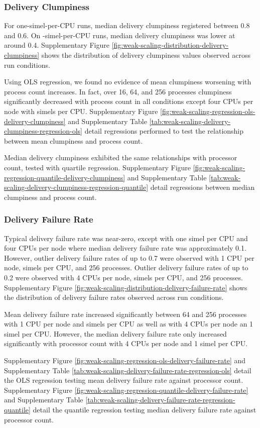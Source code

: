 \subsubsection{Delivery Clumpiness}

For one-simel-per-CPU runs, median delivery clumpiness registered between 0.8 and 0.6.
On -simel-per-CPU runs, median delivery clumpiness was lower at around 0.4.
Supplementary Figure \ref{fig:weak-scaling-distribution-delivery-clumpiness}
shows the distribution of delivery clumpiness values observed across run conditions.

Using OLS regression, we found no evidence of mean clumpiness worsening with process count increases.
In fact, over 16, 64, and 256 processes clumpiness significantly decreased with process count in all conditions except four CPUs per node with  simels per CPU.
Supplementary Figure \ref{fig:weak-scaling-regression-ols-delivery-clumpiness} and Supplementary Table \ref{tab:weak-scaling-delivery-clumpiness-regression-ols} detail regressions performed to test the relationship between mean clumpiness and process count.

Median delivery clumpiness exhibited the same relationships with processor count, tested with quartile regression.
Supplementary Figure \ref{fig:weak-scaling-regression-quantile-delivery-clumpiness} and Supplementary Table \ref{tab:weak-scaling-delivery-clumpiness-regression-quantile} detail regressions between median clumpiness and process count.

\subsubsection{Delivery Failure Rate}

Typical delivery failure rate was near-zero, except with one simel per CPU and four CPUs per node where median delivery failure rate was approximately 0.1.
However, outlier delivery failure rates of up to 0.7 were observed with 1 CPU per node,  simels per CPU, and 256 processes.
Outlier delivery failure rates of up to 0.2 were observed with 4 CPUs per node,  simels per CPU, and 256 processes.
Supplementary Figure \ref{fig:weak-scaling-distribution-delivery-failure-rate} shows the distribution of delivery failure rates observed across run conditions.

Mean delivery failure rate increased significantly between 64 and 256 processes with 1 CPU per node and  simels per CPU as well as with 4 CPUs per node an 1 simel per CPU.
However, the median delivery failure rate only increased significantly with processor count with 4 CPUs per node and 1 simel per CPU.

Supplementary Figure \ref{fig:weak-scaling-regression-ols-delivery-failure-rate} and Supplementary Table \ref{tab:weak-scaling-delivery-failure-rate-regression-ols} detail the OLS regression testing mean delivery failure rate against processor count.
Supplementary Figure \ref{fig:weak-scaling-regression-quantile-delivery-failure-rate} and Supplementary Table \ref{tab:weak-scaling-delivery-failure-rate-regression-quantile} detail the quantile regression testing median delivery failure rate against processor count.
